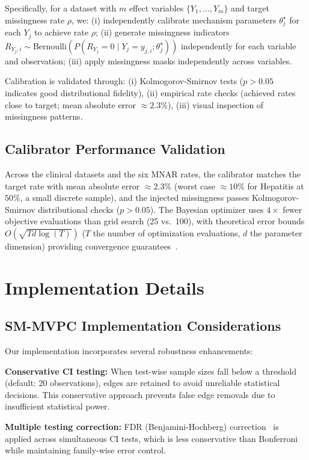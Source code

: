 \documentclass[runningheads]{llncs}
\begin{document}
Specifically, for a dataset with $m$ effect variables $\{Y_1, \ldots, Y_m\}$ and target missingness rate $\rho$, we: (i) independently calibrate mechanism parameters $\theta_j^\star$ for each $Y_j$ to achieve rate $\rho$; (ii) generate missingness indicators $R_{Y_j,i} \sim \mathrm{Bernoulli}(P(R_{Y_j}=0 \mid Y_j=y_{j,i}; \theta_j^\star))$ independently for each variable and observation; (iii) apply missingness masks independently across variables.

Calibration is validated through: (i) Kolmogorov-Smirnov tests ($p>0.05$ indicates good distributional fidelity), (ii) empirical rate checks (achieved rates close to target; mean absolute error $\approx2.3\%$), (iii) visual inspection of missingness patterns.

\subsection{Calibrator Performance Validation}

Across the clinical datasets and the six MNAR rates, the calibrator matches the target rate with mean absolute error $\approx2.3\%$ (worst case $\approx10\%$ for Hepatitis at $50\%$, a small discrete sample), and the injected missingness passes Kolmogorov-Smirnov distributional checks ($p>0.05$). The Bayesian optimizer uses $4\times$ fewer objective evaluations than grid search (25 vs.\ 100), with theoretical error bounds $O(\sqrt{T d \log(T)})$ ($T$ the number of optimization evaluations, $d$ the parameter dimension) providing convergence guarantees~\cite{srinivas2009gaussian}.

\section{Implementation Details}

\subsection{SM-MVPC Implementation Considerations}

Our implementation incorporates several robustness enhancements:

\textbf{Conservative CI testing:} When test-wise sample sizes fall below a threshold (default: 20 observations), edges are retained to avoid unreliable statistical decisions. This conservative approach prevents false edge removals due to insufficient statistical power.

\textbf{Multiple testing correction:} FDR (Benjamini-Hochberg) correction~\cite{benjamini1995controlling} is applied across simultaneous CI tests, which is less conservative than Bonferroni while maintaining family-wise error control.
\end{document}
